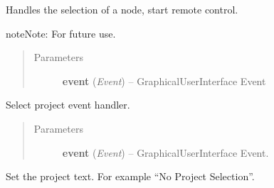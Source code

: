 \documentclass[letterpaper,10pt,english]{sphinxmanual}
\begin{document}
\begin{fulllineitems}
\begin{fulllineitems}
\begin{quote}
\begin{description}
\end{description}\end{quote}

\end{fulllineitems}


\begin{fulllineitems}
\label{diwacs:diwacs.GraphicalUserInterface.SelectNode}
Handles the selection of a node, start remote control.

\begin{notice}{note}{Note:}
For future use.
\end{notice}
\begin{quote}\begin{description}
\item[{Parameters}] \leavevmode
\textbf{event} (\emph{Event}) -- GraphicalUserInterface Event

\end{description}\end{quote}

\end{fulllineitems}


\begin{fulllineitems}
\label{diwacs:diwacs.GraphicalUserInterface.SelectProjectDialog}
Select project event handler.
\begin{quote}\begin{description}
\item[{Parameters}] \leavevmode
\textbf{event} (\emph{Event}) -- GraphicalUserInterface Event.

\end{description}\end{quote}

\end{fulllineitems}


\begin{fulllineitems}
\label{diwacs:diwacs.GraphicalUserInterface.SetProjectName}
Set the project text.
For example ``No Project Selection''.


\end{fulllineitems}
\end{fulllineitems}
\end{document}
